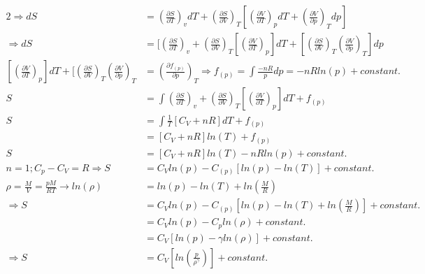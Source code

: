 \begin{latin}
\begin{alignat*}{2}
        \Longrightarrow dS &= (\frac{\partial S}{\partial T})_v dT + (\frac{\partial S}{\partial V})_T[(\frac{\partial V}{\partial T})_p dT + (\frac{\partial V}{\partial p})_T dp]\\
        \Longrightarrow dS &= [(\frac{\partial S}{\partial T})_v +(\frac{\partial S}{\partial V})_T[(\frac{\partial V}{\partial T})_p]dT + [(\frac{\partial S}{\partial V})_T (\frac{\partial V}{\partial p})_T]dp\\
        [(\frac{\partial V}{\partial T})_p]dT + [(\frac{\partial S}{\partial V})_T (\frac{\partial V}{\partial p})_T &= (\frac{\partial f_{(p)}}{\partial p})_T \Rightarrow f_{(p)} = \int \frac{-nR}{p}dp = -nR ln(p) + constant.\\
        S &= \int (\frac{\partial S}{\partial T})_v +(\frac{\partial S}{\partial V})_T[(\frac{\partial V}{\partial T})_p]dT + f_{(p)}\\
        S &= \int \frac{1}{T} [C_V +nR]dT + f_{(p)}\\
        &= [C_V +nR]ln(T) +f_{(p)}\\
        S &= [C_V +nR]ln(T) - nR ln(p) + constant.\\
        n = 1 ; C_p - C_V = R \Rightarrow S &= C_V ln(p) - C_(p)[ln(p) - ln(T)] + constant.\\
        \rho = \frac{M}{V} = \frac{pM}{RT} \to ln(\rho) &= ln(p)- ln(T) + ln(\frac{M}{R})\\
        \Longrightarrow S &=  C_V ln(p) - C_(p)[ln(p) - ln(T) +ln(\frac{M}{R})] + constant.\\
        &= C_V ln(p) - C_p ln(\rho) + constant.\\
        &= C_V[ln(p)- \gamma ln(\rho) ]+ constant.\\
        \Longrightarrow S &= C_V [ln(\frac{p}{\rho^{\gamma}})]+ constant.
    \end{alignat*}

\end{latin}